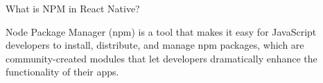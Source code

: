 What is NPM in React Native?

Node Package Manager (npm) is a tool that makes it easy for JavaScript 
developers to install, distribute, and manage npm packages, which are community-created 
modules that let developers dramatically enhance the functionality of their apps.